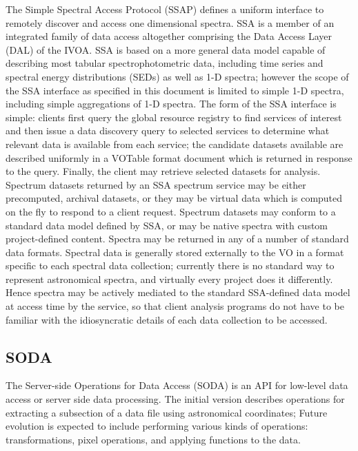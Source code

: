 \documentclass[11pt,letter]{ivoa}
\begin{document}
The Simple Spectral Access Protocol (SSAP) \citep{2012ivoa.spec.0210T} defines a uniform interface to remotely discover and 
access one dimensional spectra. SSA is a member of an integrated family of data access 
altogether comprising the Data Access Layer (DAL) of the IVOA. SSA is based on a more 
general data model capable of describing most tabular spectrophotometric data, including 
time series and spectral energy distributions (SEDs) as well as 1-D spectra; however the 
scope of the SSA interface as specified in this document is limited to simple 1-D spectra,
including simple aggregations of 1-D spectra. The form of the SSA interface is simple: 
clients first query the global resource registry to find services of interest and then 
issue a data discovery query to selected services to determine what relevant data is 
available from each service; the candidate datasets available are described uniformly 
in a VOTable format document which is returned in response to the query. Finally, the 
client may retrieve selected datasets for analysis. Spectrum datasets returned by an SSA 
spectrum service may be either precomputed, archival datasets, or they may be virtual 
data which is computed on the fly to respond to a client request. Spectrum datasets may 
conform to a standard data model defined by SSA, or may be native spectra with custom 
project-defined content. Spectra may be returned in any of a number of standard data 
formats. Spectral data is generally stored externally to the VO in a format specific to 
each spectral data collection; currently there is no standard way to represent astronomical 
spectra, and virtually every project does it differently. Hence spectra may be actively 
mediated to the standard SSA-defined data model at access time by the service, so that 
client analysis programs do not have to be familiar with the idiosyncratic details of each 
data collection to be accessed. 

\subsection{SODA} 

The Server-side Operations for Data Access (SODA) \citep{2017ivoa.spec.0517B} is an API for low-level data access or server side 
data processing. The initial version describes operations for extracting a subsection of a data
file using astronomical coordinates; Future evolution is expected to include performing 
various kinds of operations: transformations, pixel operations, and applying functions to the data.
\end{document}
